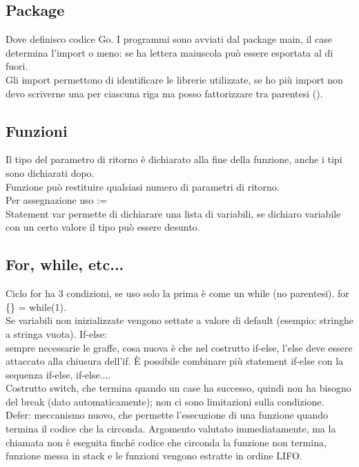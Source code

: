 \documentclass[16px]{article}
\begin{document}
\subsection{Package}
Dove definisco codice Go. I programmi sono avviati dal package main, il case determina l'import o meno: se ha lettera maiuscola può essere esportata al di fuori.\\ Gli import permettono di identificare le librerie utilizzate, se ho più import non devo scriverne una per ciascuna riga ma posso fattorizzare tra parentesi ().
\subsection{Funzioni}
Il tipo del parametro di ritorno è dichiarato alla fine della funzione, anche i tipi sono dichiarati dopo.\\ Funzione può restituire qualsiasi numero di parametri di ritorno.\\ Per assegnazione uso :=\\ Statement var permette di dichiarare una lista di variabili, se dichiaro variabile con un certo valore il tipo può essere desunto.
\subsection{For, while, etc...}
Ciclo for ha 3 condizioni, se uso solo la prima è come un while (no parentesi). for \{\} = while(1).\\ Se variabili non inizializzate vengono settate a valore di default (esempio: stringhe a stringa vuota).
If-else: \\ sempre necessarie le graffe, cosa nuova è che nel costrutto if-else, l'else deve essere attaccato alla chiusura dell'if. È possibile combinare più statement if-else con la sequenza if-else, if-else....\\ Costrutto switch, che termina quando un case ha successo, quindi non ha bisogno del break (dato automaticamente); non ci sono limitazioni sulla condizione.\\ Defer: meccanismo nuovo, che permette l'esecuzione di una funzione quando termina il codice che la circonda. Argomento valutato immediatamente, ma la chiamata non è eseguita finché codice che circonda la funzione non termina, funzione messa in stack e le funzioni vengono estratte in ordine LIFO.
\end{document}
